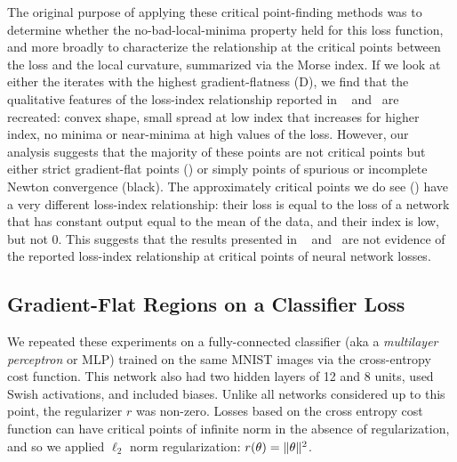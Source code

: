 \documentclass[../../thesis.tex]{subfiles}
\begin{document}
The original purpose of applying these critical point-finding methods
was to determine whether the no-bad-local-minima property held
for this loss function, and more broadly to characterize
the relationship at the critical points
between the loss and the local curvature,
summarized via the Morse index.
If we look at either the iterates with the highest gradient-flatness
(D),
we find that the qualitative features of the loss-index relationship reported in%
~\cite{dauphin2014} and~\cite{pennington2017} are recreated:
convex shape, small spread at low index that increases for higher index,
no minima or near-minima at high values of the loss.
However, our analysis suggests that the majority of these points are not critical points
but either strict gradient-flat points (\failcolor{})
or simply points of spurious or incomplete
Newton convergence (black).
The approximately critical points we do see (\successcolor{})
have a very different loss-index relationship:
their loss is equal to the loss of a network
that has constant output equal to the mean of the data,
and their index is low, but not 0.
This suggests that the results presented in%
~\cite{dauphin2014} and~\cite{pennington2017}
are not evidence of the reported loss-index relationship at
critical points of neural network losses.

\subsection{Gradient-Flat Regions on a Classifier Loss}

We repeated these experiments on a fully-connected classifier
(aka a \emph{multilayer perceptron} or MLP)
trained on the same MNIST images via the cross-entropy cost function.
This network also had two hidden layers of 12 and 8 units,
used Swish activations, and included biases.
Unlike all networks considered up to this point,
the regularizer $r$ was non-zero.
Losses based on the cross entropy cost function
can have critical points of infinite norm
in the absence of regularization,
and so we applied $\ell_2$ norm regularization:
$r(\theta) = \lVert\theta\rVert^2$.
\end{document}

